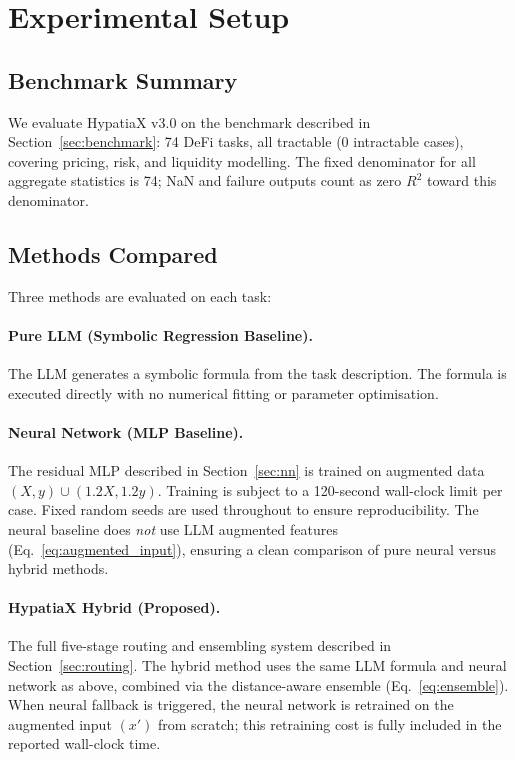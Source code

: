 \documentclass[twoside,11pt]{article}
\newcommand{\Rsq}{R^{2}}
\begin{document}
\section{Experimental Setup}
\label{sec:setup}

\subsection{Benchmark Summary}\label{subsec:benchmark-summary}
\label{sec:setup_summary}

We evaluate HypatiaX v3.0 on the benchmark described in Section~\ref{sec:benchmark}:
74 DeFi tasks, all tractable (0 intractable cases), covering pricing, risk, and
liquidity modelling.  The fixed denominator for all aggregate statistics is 74;
NaN and failure outputs count as zero $\Rsq$ toward this denominator.

\subsection{Methods Compared}\label{subsec:methods-compared}
\label{sec:setup_methods}

Three methods are evaluated on each task:

\paragraph{Pure LLM (Symbolic Regression Baseline).}
The LLM generates a symbolic formula from the task description.  The formula is
executed directly with no numerical fitting or parameter optimisation.

\paragraph{Neural Network (MLP Baseline).}
The residual MLP described in Section~\ref{sec:nn} is trained on augmented data
$(X, y) \cup (1.2X, 1.2y)$.  Training is subject to a 120-second wall-clock
limit per case.  Fixed random seeds are used throughout to ensure reproducibility.
The neural baseline does \emph{not} use LLM augmented features (Eq.~\ref{eq:augmented_input}),
ensuring a clean comparison of pure neural versus hybrid methods.

\paragraph{HypatiaX Hybrid (Proposed).}
The full five-stage routing and ensembling system described in Section~\ref{sec:routing}.
The hybrid method uses the same LLM formula and neural network as above, combined via
the distance-aware ensemble (Eq.~\ref{eq:ensemble}).  When neural fallback is triggered,
the neural network is retrained on the augmented input $(x')$ from scratch; this
retraining cost is fully included in the reported wall-clock time.
\end{document}
